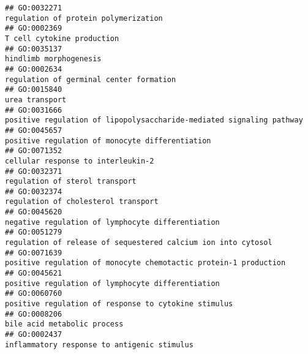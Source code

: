 \documentclass[
]{article}
\begin{document}
\begin{verbatim}
## GO:0032271                                                                                                             regulation of protein polymerization
## GO:0002369                                                                                                                       T cell cytokine production
## GO:0035137                                                                                                                           hindlimb morphogenesis
## GO:0002634                                                                                                          regulation of germinal center formation
## GO:0015840                                                                                                                                   urea transport
## GO:0031666                                                                             positive regulation of lipopolysaccharide-mediated signaling pathway
## GO:0045657                                                                                                  positive regulation of monocyte differentiation
## GO:0071352                                                                                                               cellular response to interleukin-2
## GO:0032371                                                                                                                   regulation of sterol transport
## GO:0032374                                                                                                              regulation of cholesterol transport
## GO:0045620                                                                                                negative regulation of lymphocyte differentiation
## GO:0051279                                                                                    regulation of release of sequestered calcium ion into cytosol
## GO:0071639                                                                                 positive regulation of monocyte chemotactic protein-1 production
## GO:0045621                                                                                                positive regulation of lymphocyte differentiation
## GO:0060760                                                                                             positive regulation of response to cytokine stimulus
## GO:0008206                                                                                                                      bile acid metabolic process
## GO:0002437                                                                                                      inflammatory response to antigenic stimulus

\end{verbatim}
\end{document}

